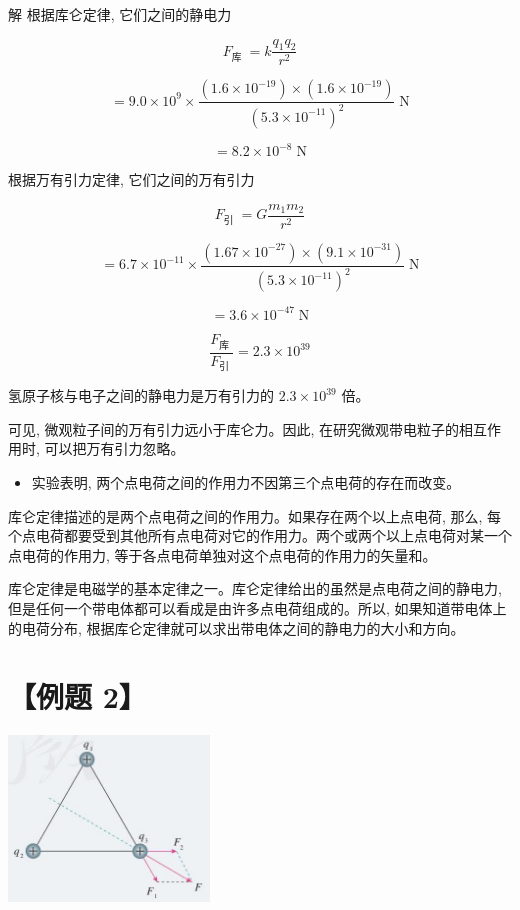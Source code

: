 \documentclass[10pt]{article}
\begin{document}
解 根据库仑定律, 它们之间的静电力

\[
{F}_{\text{库 }} = k\frac{{q}_{1}{q}_{2}}{{r}^{2}}
\]

\[
= {9.0} \times {10}^{9} \times \frac{\left( {{1.6} \times {10}^{-{19}}}\right) \times \left( {{1.6} \times {10}^{-{19}}}\right) }{{\left( {5.3} \times {10}^{-{11}}\right) }^{2}}\mathrm{\;N}
\]

\[
= {8.2} \times {10}^{-8}\mathrm{\;N}
\]

根据万有引力定律, 它们之间的万有引力

\[
{F}_{\text{引 }} = G\frac{{m}_{1}{m}_{2}}{{r}^{2}}
\]

\[
= {6.7} \times {10}^{-{11}} \times \frac{\left( {{1.67} \times {10}^{-{27}}}\right) \times \left( {{9.1} \times {10}^{-{31}}}\right) }{{\left( {5.3} \times {10}^{-{11}}\right) }^{2}}\mathrm{\;N}
\]

\[
= {3.6} \times {10}^{-{47}}\mathrm{\;N}
\]

\[
\frac{{F}_{\text{库 }}}{{F}_{\text{引 }}} = {2.3} \times {10}^{39}
\]

氢原子核与电子之间的静电力是万有引力的 \({2.3} \times {10}^{39}\) 倍。

可见, 微观粒子间的万有引力远小于库仑力。因此, 在研究微观带电粒子的相互作用时, 可以把万有引力忽略。

\begin{mdframed}

\begin{itemize}
\item 实验表明, 两个点电荷之间的作用力不因第三个点电荷的存在而改变。
\end{itemize}

\end{mdframed}

库仑定律描述的是两个点电荷之间的作用力。如果存在两个以上点电荷, 那么, 每个点电荷都要受到其他所有点电荷对它的作用力。两个或两个以上点电荷对某一个点电荷的作用力, 等于各点电荷单独对这个点电荷的作用力的矢量和。

库仑定律是电磁学的基本定律之一。库仑定律给出的虽然是点电荷之间的静电力, 但是任何一个带电体都可以看成是由许多点电荷组成的。所以, 如果知道带电体上的电荷分布, 根据库仑定律就可以求出带电体之间的静电力的大小和方向。

\section*{【例题 2】}

\begin{center}
\includegraphics[max width=0.4\textwidth]{images/01911d5f-8e38-70c0-b5b8-2b399bd115b6_14_559492.jpg}
\end{center}
\end{document}
